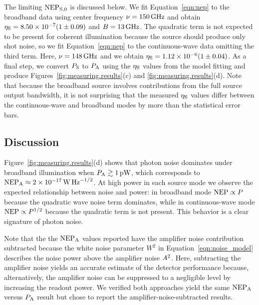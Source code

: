 The limiting $\mathrm{NEP}_{\mathrm{S}, 0}$ is discussed below.
We fit Equation~\ref{eqn:nep} to the broadband data using center frequency $\nu = \SI{150}{GHz}$ and obtain $\eta_{\mathrm{S}} = \num{8.50e-7} (1 \pm 0.09)$ and $B = \SI{13}{GHz}$.
The quadratic term is not expected to be present for coherent illumination because the source should produce only shot noise, so we fit Equation~\ref{eqn:nep} to the continuous-wave data omitting the third term.
Here, $\nu = \SI{148}{GHz}$ and we obtain $\eta_{\mathrm{S}} = \num{1.12e-6} (1 \pm
0.04)$.
As a final step, we convert $P_{\mathrm{S}}$ to $P_{\mathrm{A}}$ using the $\eta_{\mathrm{S}}$ values from the model fitting and produce Figures~\ref{fig:measuring.results}(c) and \ref{fig:measuring.results}(d).
Note that because the broadband source involves contributions from the full source output bandwidth, it is not surprising that the measured $\eta_{\mathrm{S}}$ values differ between the continuous-wave and broadband modes by more than the statistical error bars.

\subsection{Discussion}

Figure~\ref{fig:measuring.results}(d) shows that photon noise dominates under broadband illumination when
$P_{\mathrm{A}} \gtrsim \SI{1}{pW}$,
which corresponds to 
$\mathrm{NEP}_{\mathrm{A}} \approx \SI{2e-17}{W.Hz^{-1/2}}$.
At high power in each source mode we observe the expected relationship between noise and power: in broadband mode $\mathrm{NEP} \propto P$ because the quadratic wave noise term dominates, while in continuous-wave mode $\mathrm{NEP} \propto P^{1/2}$ because the quadratic term is not present.
This behavior is a clear signature of photon noise.

Note that the the $\mathrm{NEP}_{\mathrm{A}}$ values reported have the amplifier noise contribution subtracted because the white noise parameter $W^2$ in Equation~\ref{eqn:noise_model} describes the noise power above the amplifier noise $A^2$.
Here, subtracting the amplifier noise yields an accurate estimate of the detector performance because, alternatively, the amplifier noise can be suppressed to a negligible level by increasing the readout power.
We verified both approaches yield the same $\mathrm{NEP}_{\mathrm{A}}$ versus $P_{\mathrm{A}}$ result but chose to report the amplifier-noise-subtracted results.

